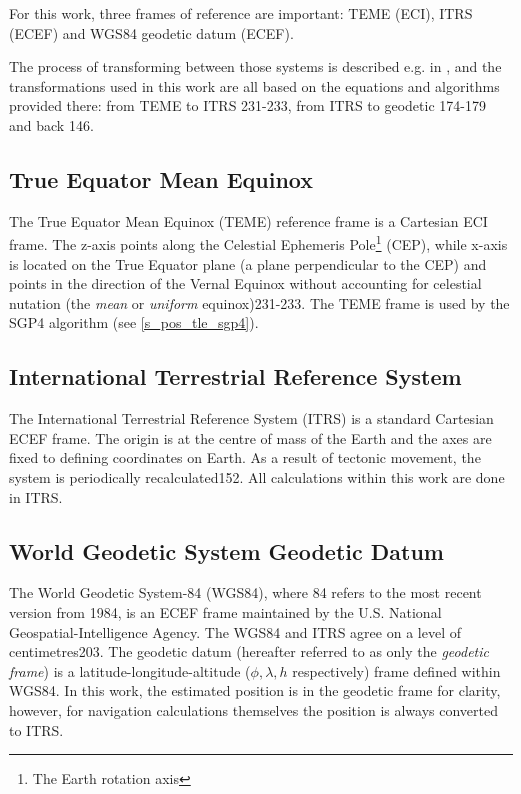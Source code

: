 For this work, three frames of reference are important: TEME (ECI), ITRS (ECEF) and WGS84 geodetic datum (ECEF).

The process of transforming between those systems is described e.g. in \cite{pos01}, and the transformations used in this work are all based on the equations and algorithms provided there: from TEME to ITRS \citep{pos01}{231-233}, from ITRS to geodetic \citep{pos01}{174-179} and back \citep{pos01}{146}.

\subsection{True Equator Mean Equinox}
The True Equator Mean Equinox (TEME) reference frame is a Cartesian ECI frame. The z-axis points along the Celestial Ephemeris Pole\footnote{The Earth rotation axis} (CEP), while x-axis is located on the True Equator plane (a plane perpendicular to the CEP) and points in the direction of the Vernal Equinox without accounting for celestial nutation (the \textit{mean} or \textit{uniform} equinox)\citep{pos01}{231-233}. The TEME frame is used by the SGP4 algorithm (see \autoref{s_pos_tle_sgp4}).

\subsection{International Terrestrial Reference System}
The International Terrestrial Reference System (ITRS) is a standard Cartesian ECEF frame. The origin is at the centre of mass of the Earth and the axes are fixed to defining coordinates on Earth. As a result of tectonic movement, the system is periodically recalculated\citep{pos01}{152}. All calculations within this work are done in ITRS.

\subsection{World Geodetic System Geodetic Datum}
The World Geodetic System-84 (WGS84), where 84 refers to the most recent version from 1984, is an ECEF frame maintained by the U.S. National Geospatial-Intelligence Agency. The WGS84 and ITRS agree on a level of centimetres\citep{pos01}{203}. The geodetic datum  (hereafter referred to as only the \textit{geodetic frame}) is a latitude-longitude-altitude ($\phi, \lambda, h$ respectively) frame defined within WGS84. In this work, the estimated position is in the geodetic frame for clarity, however, for navigation calculations themselves the position is always converted to ITRS.

